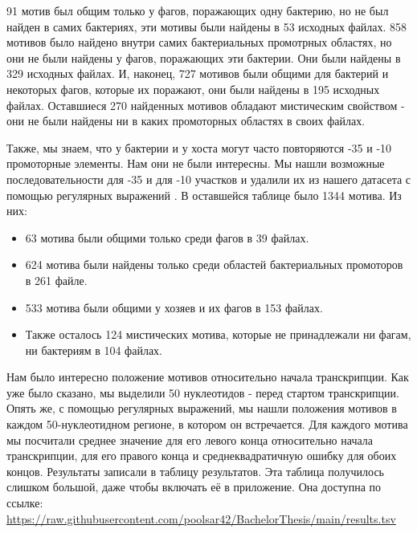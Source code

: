 \documentclass[14pt]{extarticle}
\begin{document}
    \par{91 мотив был общим только у фагов, поражающих одну бактерию, но не был найден в самих бактериях, эти мотивы 
    были найдены в 53 исходных файлах. 858 мотивов было найдено внутри самих бактериальных промотрных областях, но они 
    не были найдены у фагов, поражающих эти бактерии. Они были найдены в 329 исходных файлах. И, наконец, 727 мотивов 
    были общими для бактерий и некоторых фагов, которые их поражают, они были найдены в 195 исходных файлах.  Оставшиеся
    270 найденных мотивов обладают мистическим свойством - они не были найдены ни в каких промоторных областях в своих 
    файлах.}

\par{Также, мы знаем, что у бактерии и у хоста могут часто повторяются -35 и -10 промоторные элементы. Нам они не
    были интересны. Мы нашли возможные последовательности для -35 и для -10 участков \cite{-35,-10,-35-10,-35-10wiki} и 
    удалили их из нашего датасета с помощью регулярных выражений \cite{re}. В оставшейся таблице было 1344 мотива. Из 
    них:} 
    
    \begin{itemize}
        \item 63 мотива были общими только среди фагов в 39 файлах.
        \item 624 мотива были найдены только среди областей бактериальных промоторов в 261 файле.
        \item 533 мотива были общими у хозяев и их фагов в 153 файлах.
        \item Также осталось 124 мистических мотива, которые не принадлежали ни фагам, ни бактериям в 104 файлах. 
    \end{itemize}
    
    \par{Нам было интересно положение мотивов относительно начала транскрипции. Как уже было сказано, мы выделили 50 
    нуклеотидов - перед стартом транскрипции. Опять же, с помощью регулярных выражений, мы нашли положения мотивов в
    каждом 50-нуклеотидном регионе, в котором он встречается. Для каждого мотива мы посчитали среднее значение для его
    левого конца относительно начала транскрипции, для его правого конца и среднеквадратичную ошибку для обоих
    концов. Результаты записали в таблицу результатов. Эта таблица получилось слишком большой, даже чтобы включать её в 
    приложение. Она доступна по ссылке:
    \url{https://raw.githubusercontent.com/poolsar42/BachelorThesis/main/results.tsv}}
\end{document}
